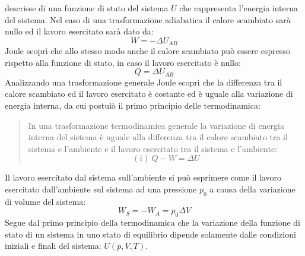 \documentclass{article}
\numberwithin{equation}{subsection}
\begin{document}
descrisse di una funzione di stato del sistema $U$ che 
rappresenta l'energia interna del sistema. Nel caso di una 
trasformazione adiabatica il calore scambiato sarà nullo ed il 
lavoro esercitato sarà dato da:
\begin{equation}
    W=-\Delta U_{AB}
\end{equation}
Joule scoprì che allo stesso modo anche il calore scambiato 
può essere espresso 
rispetto alla funzione di stato, in caso il lavoro esercitato 
è nullo:
\begin{equation}
    Q=\Delta U_{AB}
\end{equation}
Analizzando una trasformazione generale Joule scoprì che 
la differenza tra il calore scambiato ed il lavoro esercitato è 
costante ed è uguale alla variazione di energia interna, da cui 
postulò il primo principio delle termodinamica:
\begin{quotation}
    In una trasformazione termodinamica generale la variazione 
    di energia interna del sistema è uguale alla differenza tra 
    il calore scambiato tra il sistema e l'ambiente e il lavoro 
    esercitato tra il sistema e l'ambiente:
    \begin{equation}
     (i)\:   Q-W=\Delta U
    \end{equation}
\end{quotation}
Il lavoro esercitato dal sistema sull'ambiente si può 
esprimere come il lavoro esercitato dall'ambiente sul sistema 
ad una pressione $p_0$ a causa della variazione di volume 
del sistema:
\begin{equation}
    W_S=-W_A=p_0\Delta V
\end{equation}
Segue dal primo principio della termodinamica che la 
variazione della funzione di stato di un sistema in uno stato 
di equilibrio dipende solamente dalle condizioni iniziali e 
finali del sistema: $U(p,V,T)$.
\end{document}
